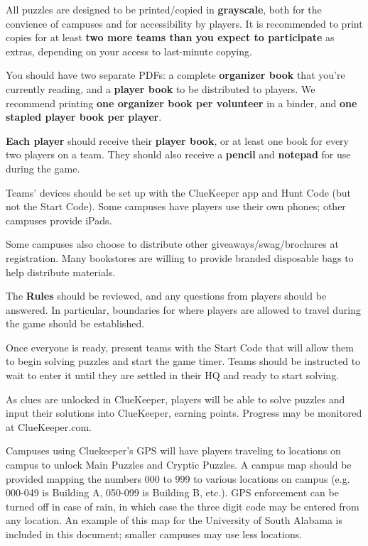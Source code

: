 
All puzzles are designed to be printed/copied in \textbf{grayscale}, both
for the convience of campuses and for accessibility by players.
It is recommended to print copies for at least
\textbf{two more teams than you expect to participate} as extras, depending
on your access to last-minute copying.

You should have two separate PDFs: a complete \textbf{organizer book} that you're
currently reading, and a \textbf{player book} to be distributed to players.
We recommend printing \textbf{one organizer book per volunteer} in a binder,
and \textbf{one stapled player book per player}. 


\textbf{Each player} should receive their \textbf{player book}, or at
least one book for every two players on a team.
They should also receive a \textbf{pencil} and \textbf{notepad} for use
during the game.

Teams' devices should be set up with the ClueKeeper app and Hunt Code
(but not the Start Code). Some campuses have players use their own phones; 
other campuses provide iPads.

Some campuses also choose to distribute other giveaways/swag/brochures
at registration. Many bookstores are willing to provide branded disposable
bags to help distribute materials.


The \textbf{Rules} should be reviewed, and any questions from players
should be answered. In particular, boundaries for where players are allowed
to travel during the game should be established.

Once everyone is ready, present teams with the Start Code that will allow them
to begin solving puzzles and start the game timer. Teams should be instructed
to wait to enter it until they are settled in their HQ and ready to start solving.


As clues are unlocked in ClueKeeper, players will be able to solve puzzles
and input their solutions into ClueKeeper, earning points. Progress
may be monitored at ClueKeeper.com.

Campuses using Cluekeeper's GPS will have players traveling to locations
on campus to unlock Main Puzzles and Cryptic Puzzles. A campus map should
be provided mapping the numbers 000 to 999 to various locations on campus
(e.g. 000-049 is Building A, 050-099 is Building B, etc.). 
GPS enforcement can be turned off in case of rain, in which case the
three digit code may be entered from any location. An example of this map
for the University of South Alabama is included in this document; smaller
campuses may use less locations.


